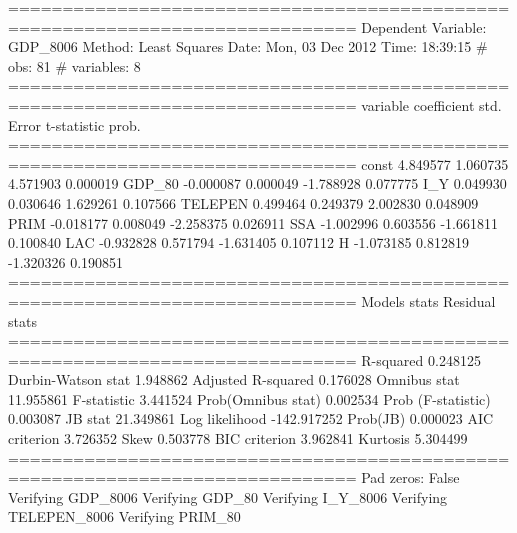 ==============================================================================
Dependent Variable: GDP_8006
Method: Least Squares
Date:  Mon, 03 Dec 2012
Time:  18:39:15
# obs:                  81
# variables:         8
==============================================================================
variable     coefficient     std. Error      t-statistic     prob.
==============================================================================
const           4.849577      1.060735      4.571903      0.000019
GDP_80          -0.000087      0.000049     -1.788928      0.077775
I_Y             0.049930      0.030646      1.629261      0.107566
TELEPEN           0.499464      0.249379      2.002830      0.048909
PRIM           -0.018177      0.008049     -2.258375      0.026911
SSA            -1.002996      0.603556     -1.661811      0.100840
LAC            -0.932828      0.571794     -1.631405      0.107112
H              -1.073185      0.812819     -1.320326      0.190851
==============================================================================
Models stats                         Residual stats
==============================================================================
R-squared             0.248125         Durbin-Watson stat   1.948862
Adjusted R-squared    0.176028         Omnibus stat         11.955861
F-statistic           3.441524         Prob(Omnibus stat)   0.002534
Prob (F-statistic)    0.003087			JB stat              21.349861
Log likelihood       -142.917252			Prob(JB)             0.000023
AIC criterion         3.726352         Skew                 0.503778
BIC criterion         3.962841         Kurtosis             5.304499
==============================================================================
Pad zeros:  False
Verifying GDP_8006
Verifying GDP_80
Verifying I_Y_8006
Verifying TELEPEN_8006
Verifying PRIM_80

